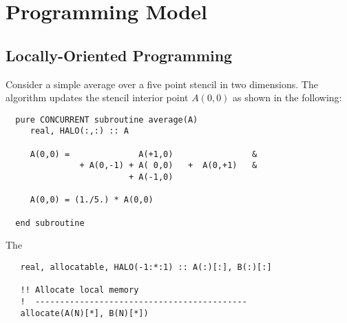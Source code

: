 \section{Programming Model}

\subsection{Locally-Oriented Programming}


Consider a simple average over a five point stencil in two dimensions.  The algorithm updates the
stencil interior point $A(0,0)$ as shown in the following:

\begin{verbatim}
  pure CONCURRENT subroutine average(A)
     real, HALO(:,:) :: A

     A(0,0) =              A(+1,0)                &
               + A(0,-1) + A( 0,0)   +  A(0,+1)   &
                         + A(-1,0)

     A(0,0) = (1./5.) * A(0,0)

  end subroutine
\end{verbatim}

The 

\begin{verbatim}
   real, allocatable, HALO(-1:*:1) :: A(:)[:], B(:)[:]

   !! Allocate local memory
   !  -------------------------------------------
   allocate(A(N)[*], B(N)[*])
\end{verbatim}

